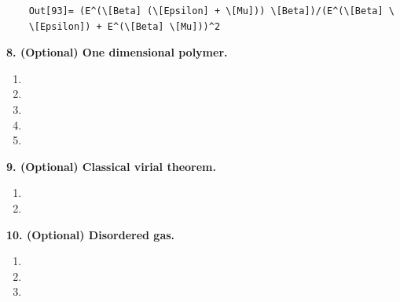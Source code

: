 \documentclass{article}
\theoremstyle{definition}
\begin{document}
\begin{enumerate}[label=(\alph*)]
\begin{lstlisting}
 	Out[93]= (E^(\[Beta] (\[Epsilon] + \[Mu])) \[Beta])/(E^(\[Beta] \
 	\[Epsilon]) + E^(\[Beta] \[Mu]))^2
 	\end{lstlisting}
 	
\end{enumerate}



\noindent \textbf{8. (Optional) One dimensional polymer.}

\begin{enumerate}[label=(\alph*)]
	\item 
	
	\item 
	
	\item
	
	\item 
	
	\item  
\end{enumerate}


\noindent \textbf{9. (Optional) Classical virial theorem.}

\begin{enumerate}[label=(\alph*)]
	\item 
	
	\item 
	
\end{enumerate}


\noindent \textbf{10. (Optional) Disordered gas.}


\begin{enumerate}[label=(\alph*)]
	\item 
	
	\item 
	
	\item 
\end{enumerate}
\end{document}
